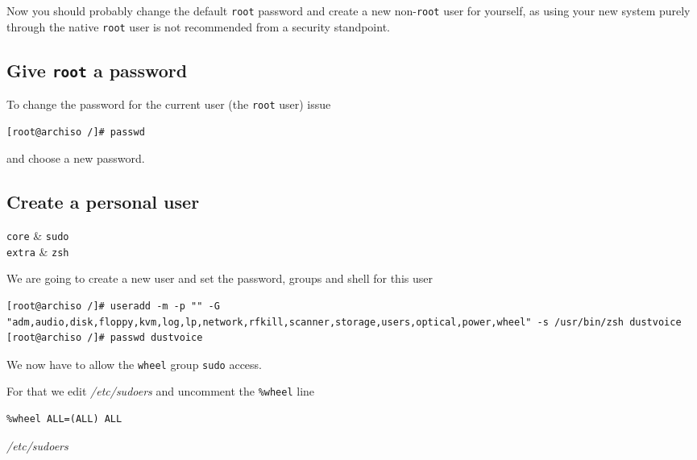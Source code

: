 \documentclass[10pt]{dustdoc}
\begin{document}
Now you should probably change the default \texttt{root} password and create a new non-\texttt{root} user for yourself, as using your new system purely through the native \texttt{root} user is not recommended from a security standpoint.

\subsection{Give \texttt{root} a password}
\label{sec:give-root-a-password}

To change the password for the current user (the \texttt{root} user) issue

\begin{verbatim}
[root@archiso /]# passwd
\end{verbatim}

\noindent
and choose a new password.

\subsection{Create a personal user}
\label{sec:create-a-personal-user}

\begin{packagetable}
    \texttt{core} & \texttt{sudo} \\
    \texttt{extra} & \texttt{zsh} \\
\end{packagetable}

We are going to create a new user and set the password, groups and shell for this user

\begin{verbatim}
[root@archiso /]# useradd -m -p "" -G "adm,audio,disk,floppy,kvm,log,lp,network,rfkill,scanner,storage,users,optical,power,wheel" -s /usr/bin/zsh dustvoice
[root@archiso /]# passwd dustvoice
\end{verbatim}

We now have to allow the \texttt{wheel} group \texttt{sudo} access.

For that we edit \textit{/etc/sudoers} and uncomment the \texttt{\%wheel} line

\begin{mintedlisting}
    \begin{verbatim}
%wheel ALL=(ALL) ALL
    \end{verbatim}

    \caption{\textit{/etc/sudoers}}
\end{mintedlisting}
\end{document}
